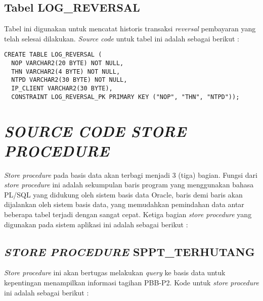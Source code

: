 \documentclass[pdftex,12pt, oneside]{article}
\begin{document}
  \subsection{Tabel LOG\_REVERSAL}
  
  Tabel ini digunakan untuk mencatat historis transaksi \textit{reversal} pembayaran yang telah selesai dilakukan. \textit{Source code} untuk tabel ini adalah sebagai berikut :
  
  \begin{lstlisting}
CREATE TABLE LOG_REVERSAL (	
  NOP VARCHAR2(20 BYTE) NOT NULL,
  THN VARCHAR2(4 BYTE) NOT NULL,
  NTPD VARCHAR2(30 BYTE) NOT NULL,
  IP_CLIENT VARCHAR2(30 BYTE),
  CONSTRAINT LOG_REVERSAL_PK PRIMARY KEY ("NOP", "THN", "NTPD"));    
  \end{lstlisting}


\section{\textit{SOURCE CODE STORE PROCEDURE}}

\textit{Store procedure} pada basis data akan terbagi menjadi 3 (tiga) bagian. Fungsi dari \textit{store procedure} ini adalah sekumpulan baris program yang menggunakan bahasa PL/SQL yang didukung oleh sistem basis data Oracle, baris demi baris akan dijalankan oleh sistem basis data, yang memudahkan pemindahan data antar beberapa tabel terjadi dengan sangat cepat. Ketiga bagian \textit{store procedure} yang digunakan pada sistem aplikasi ini adalah sebagai berikut :

\subsection{\textit{STORE PROCEDURE} SPPT\_TERHUTANG}

\textit{Store procedure} ini akan bertugas melakukan \textit{query} ke basis data untuk kepentingan menampilkan informasi tagihan PBB-P2. Kode untuk \textit{store procedure} ini adalah sebagai berikut :
\end{document}
